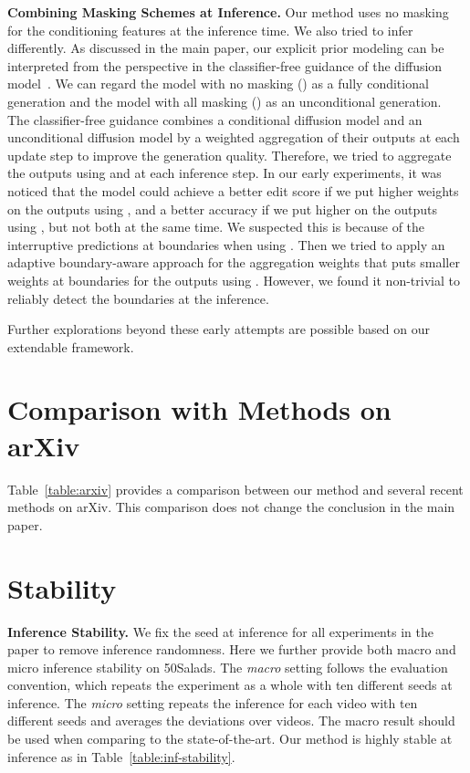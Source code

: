 \documentclass[10pt,twocolumn,letterpaper]{article}
\begin{document}
\textbf{Combining Masking Schemes at Inference.}
Our method uses no masking for the conditioning features at the inference time.
We also tried to infer differently.
As discussed in the main paper, our explicit prior modeling can be interpreted from the perspective in the classifier-free guidance of the diffusion model~\cite{CFGuidance}.
We can regard the model with no masking () as a fully conditional generation and the model with all masking () as an unconditional generation.
The classifier-free guidance combines a conditional diffusion model and an unconditional diffusion model by a weighted aggregation of their outputs at each update step to improve the generation quality.
Therefore, we tried to aggregate the outputs using  and  at each inference step.
In our early experiments, it was noticed that the model could achieve a better edit score if we put higher weights on the outputs using , and a better accuracy if we put higher on the outputs using , but not both at the same time.
We suspected this is because of the interruptive predictions at boundaries when using .
Then we tried to apply an adaptive boundary-aware approach for the aggregation weights that puts smaller weights at boundaries for the outputs using .
However, we found it non-trivial to reliably detect the boundaries at the inference.

Further explorations beyond these early attempts are possible based on our extendable framework.


\section{Comparison with Methods on arXiv}

Table~\ref{table:arxiv} provides a comparison between our method and several recent methods on arXiv. 
This comparison does not change the conclusion in the main paper.

\section{Stability}

\textbf{Inference Stability.} We fix the seed at inference for all experiments in the paper to remove inference randomness. 
Here we further provide both macro and micro inference stability on 50Salads. 
The \textit{macro} setting follows the evaluation convention, which repeats the experiment as a whole with ten different seeds at inference. 
The \textit{micro} setting repeats the inference for each video with ten different seeds and averages the deviations over videos.
The macro result should be used when comparing to the state-of-the-art.
Our method is highly stable at inference as in Table~\ref{table:inf-stability}. 
\end{document}
